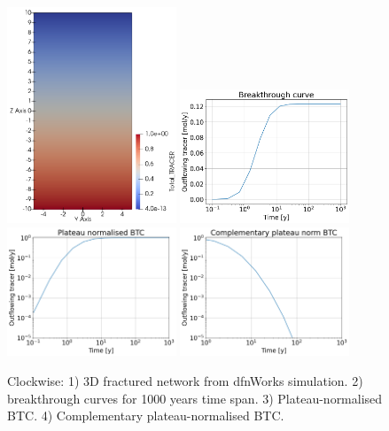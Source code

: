\documentclass{article}
\begin{document}
\begin{figure}[htbp!]
    \centering
    \includegraphics[width=0.45\textwidth]{images/dfnWorksImages/3DdfnDiffEugV7.png}
    \hspace{0.05\textwidth}
    \includegraphics[width=0.45\textwidth]{images/dfnWorksImages/btcFrom3DeugV7.png}
    \vspace{0.05\textwidth}
    \includegraphics[width=0.45\textwidth]{images/dfnWorksImages/btcFrom3DeugV7norm.png}
    \hspace{0.05\textwidth}
    \includegraphics[width=0.45\textwidth]{images/dfnWorksImages/complementaryBtcFrom3DeugV7norm.png}
    \caption{Clockwise: 1) 3D fractured network from dfnWorks simulation. 2) breakthrough curves for 1000 years time span. 3) Plateau-normalised BTC. 4) Complementary plateau-normalised BTC.}
    \label{fig:3DdfnWorksEugV7}
\end{figure}
\end{document}
